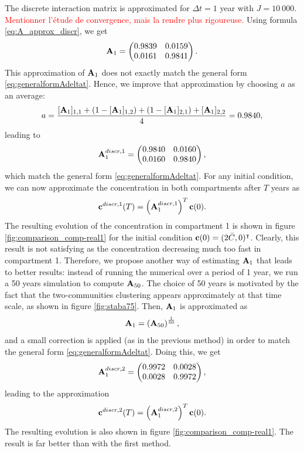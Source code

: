 The discrete interaction matrix is approximated for $\Delta t = 1$ year with $J = 10\ 000$. \textcolor{red}{Mentionner l'étude de convergence, mais la rendre plus rigoureuse.} Using formula \eqref{eq:A_approx_discr}, we get
\begin{equation}
	\mathbf A_1 = \begin{pmatrix}
		0.9839 & 0.0159 \\ 
		0.0161 & 0.9841
	\end{pmatrix}.
\end{equation}
This approximation of $\mathbf A_1$ does not exactly match the general form \eqref{eq:generalformAdeltat}. Hence, we improve that approximation by choosing $a$ as an average:
\begin{equation}
	a = \frac{[\mathbf A_1]_{1,1} + (1-[\mathbf A_1]_{1,2}) + (1 - [\mathbf A_1]_{2,1}) + [\mathbf A_1]_{2,2}}{4} = 0.9840,
\end{equation}
leading to
\begin{equation}
	\mathbf A_1^{discr,1} = \begin{pmatrix}
		0.9840 & 0.0160 \\ 
		0.0160 & 0.9840
	\end{pmatrix},
\end{equation}
which match the general form \eqref{eq:generalformAdeltat}. For any initial condition, we can now approximate the concentration in both compartments after $T$ years as
\begin{equation}
	\mathbf c^{discr,1}(T) = \left(\mathbf A_1^{discr,1}\right)^T \mathbf c(0).
\end{equation}
The resulting evolution of the concentration in compartment 1 is shown in figure \ref{fig:comparison_comp-real1} for the initial condition $\mathbf c(0) = (2\bar C,0)^\intercal$. Clearly, this result is not satisfying as the concentration decreasing much too fast in compartment 1. Therefore, we propose another way of estimating $\mathbf A_1$ that leads to better results: instead of running the numerical over a period of 1 year, we run a 50 years simulation to compute $\mathbf A_{50}$. The choice of 50 years is motivated by the fact that the two-communities clustering appears approximately at that time scale, as shown in figure \ref{fig:staba75}. Then, $\mathbf A_1$ is approximated as
\begin{equation}
	\mathbf A_1 = \left(\mathbf A_{50}\right)^{\frac{1}{50}},
\end{equation}
and a small correction is applied (as in the previous method) in order to match the general form \eqref{eq:generalformAdeltat}. Doing this, we get
\begin{equation}
	\mathbf A_1^{discr,2} = \begin{pmatrix}
		0.9972 & 0.0028 \\ 
		0.0028 & 0.9972
	\end{pmatrix},
\end{equation}
leading to the approximation
\begin{equation}
	\mathbf c^{discr,2}(T) = \left(\mathbf A_1^{discr,2}\right)^T \mathbf c(0).
\end{equation}
The resulting evolution is also shown in figure \ref{fig:comparison_comp-real1}. The result is far better than with the first method.

